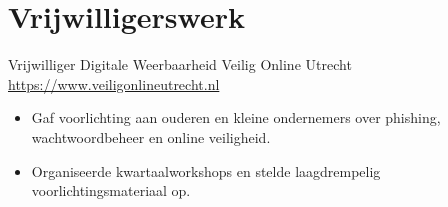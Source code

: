 \documentclass[a4paper, serif, 10pt]{moderncv}
\begin{document}
\section{Vrijwilligerswerk}

        {Vrijwilliger Digitale Weerbaarheid}
        {Veilig Online Utrecht}
        {\url{https://www.veiligonlineutrecht.nl}}
        {}
        {\begin{itemize}
\item Gaf voorlichting aan ouderen en kleine ondernemers over phishing, wachtwoordbeheer en online veiligheid.
\item Organiseerde kwartaalworkshops en stelde laagdrempelig voorlichtingsmateriaal op.
\end{itemize}}
    
\end{document}
